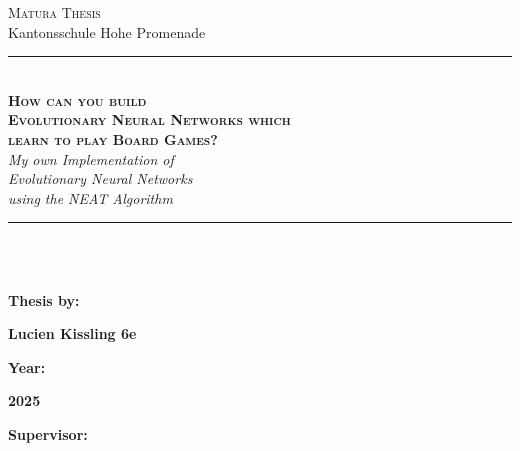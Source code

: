 \documentclass[11pt, a4paper, notitlepage]{report}
\begin{document}
    \begin{titelpage}
        \BgThispage
            \color{white} {
                \begin{center}
                    \Large \textsc{Matura Thesis}\\Kantonsschule Hohe Promenade\\
                    \rule[0.1cm]{15.8cm}{0.1mm}\\
                    \vspace{3cm}
                    \Huge \textbf{ \textsc{How can you build \\Evolutionary Neural Networks which \\learn to play Board Games?}}\\
                    \vspace{0.8cm}
                    \Large \textit {My own Implementation of \\Evolutionary Neural Networks \\using the NEAT Algorithm}\\
                \end{center}
                \vspace{3cm}
                \rule[0.1cm]{15.8cm}{0.1mm}\\
                \vspace{7cm}\\
                \begin{minipage}[t]{0.47\textwidth}
                \large\textbf {Thesis by:}\\
                \end{minipage}
                \hfill
                \begin{minipage}[t]{0.47\textwidth}\raggedleft
                \large\textbf {Lucien Kissling 6e}\\
                \end{minipage}
                \begin{minipage}[t]{0.47\textwidth}
                \large \textbf {Year:}\\
                \end{minipage}
                \hfill
                \begin{minipage}[t]{0.47\textwidth}\raggedleft
                \large \textbf {2025}\\
                \end{minipage}
                \begin{minipage}[t]{0.47\textwidth}
                \large \textbf {Supervisor:}\\

\end{minipage}}
\end{titelpage}
\end{document}

